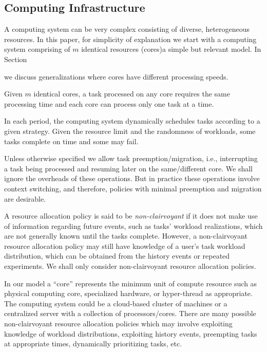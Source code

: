 \documentclass[prodmode,acmtompecs]{acmsmall}
\newcommand{\myComments}[1]{}
\newif\ifinfocom
\newif\iftompecs
\newif\ifdissertation
\newcommand{\infocomStart}{\ifinfocom \myComments{Infocom: }}
\newcommand{\tompecsStart}{\iftompecs \myComments{TOMPECS version: }}
\newcommand{\dissertationStart}{\ifdissertation  \myComments{Dissertation version: }}
\newcommand{\commentEnd}{\myComments{End}}
\begin{document}
\subsection{Computing Infrastructure}
A computing system can be very complex consisting of diverse, heterogeneous resources. 
In this paper, for simplicity of explanation we start with a computing system comprising of $m$ identical resources (cores)\textemdash a simple but relevant model. 
In Section 
\infocomStart
\ref{section_generalizations} 
\commentEnd\fi
\tompecsStart
\ref{section_possible_generalizations}
\commentEnd\fi
we discuss generalizations where cores have different processing speeds. 

Given $m$ identical cores, a task processed on any core requires the same processing time and each core can process only one task at a time. 
\dissertationStart
In this context, the workload of a task refers to the required core time to fully complete the task. 
\commentEnd\fi
In each period, the computing system dynamically schedules tasks according to a given strategy. Given the resource limit and the randomness of workloads, some tasks complete on time and some may fail. 

Unless otherwise specified we allow task preemption/migration, i.e., interrupting a task being processed and resuming later on the same/different core. We shall ignore the overheads of these operations. But in practice these operations involve context switching, and therefore, policies with minimal preemption and migration are desirable. 

A resource allocation policy is said to be {\em non-clairvoyant} if it does not make use of information regarding future events, such as tasks' workload realizations, which are not generally known until the tasks complete. However, a non-clairvoyant resource allocation policy may still have knowledge of a user's task workload distribution, which can be obtained from the history events or repeated experiments. We shall only consider non-clairvoyant resource allocation policies. 

In our model a ``core'' represents the minimum unit of compute resource such as physical computing core, specialized hardware, or hyper-thread as appropriate. The computing system could be a cloud-based cluster of machines or a centralized server with a collection of processors/cores. There are many possible non-clairvoyant resource allocation policies which may involve exploiting knowledge of workload distributions, exploiting history events, preempting tasks at appropriate times, dynamically prioritizing tasks, etc. 
\end{document}
